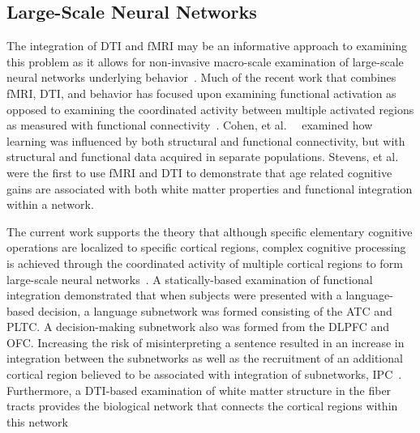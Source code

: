 \documentclass[final,authoryear,5p,times,twocolumn]{elsarticle}
\begin{document}
\subsection{Large-Scale Neural Networks}
The integration of DTI and fMRI may be an informative approach to examining this problem as it allows for non-invasive macro-scale examination of large-scale neural networks underlying behavior~\cite{Ramnani2004a,Guye2008,Rykhlevskaia2008}. Much of the recent work that combines fMRI, DTI, and behavior has focused upon examining functional activation as opposed to examining the coordinated activity between multiple activated regions as measured with functional connectivity~\cite{Aron2007a,Baird2005,Madden2007,Floel2009,Upadhyay2007}. Cohen, et al.\ ~\cite{Cohen2008a} examined how learning was influenced by both structural and functional connectivity, but with structural and functional data acquired in separate populations. Stevens, et al.\ ~\cite{Stevens2009} were the first to use fMRI and DTI to demonstrate that age related cognitive gains are associated with both white matter properties and functional integration within a network.

The current work supports the theory that although specific elementary cognitive operations are localized to specific cortical regions, complex cognitive processing is achieved through the coordinated activity of multiple cortical regions to form large-scale neural networks~\cite{Mesulam1990}. A statically-based examination of functional integration demonstrated that when subjects were presented with a language-based decision, a language subnetwork was formed consisting of the ATC and PLTC. A decision-making subnetwork also was formed from the DLPFC and OFC. Increasing the risk of misinterpreting a sentence resulted in an increase in integration between the subnetworks as well as the recruitment of an additional cortical region believed to be associated with integration of subnetworks, IPC~\cite{Jaencke2001,Assmus2003}. Furthermore, a DTI-based examination of white matter structure in the fiber tracts provides the biological network that connects the cortical regions within this network 
\end{document}
